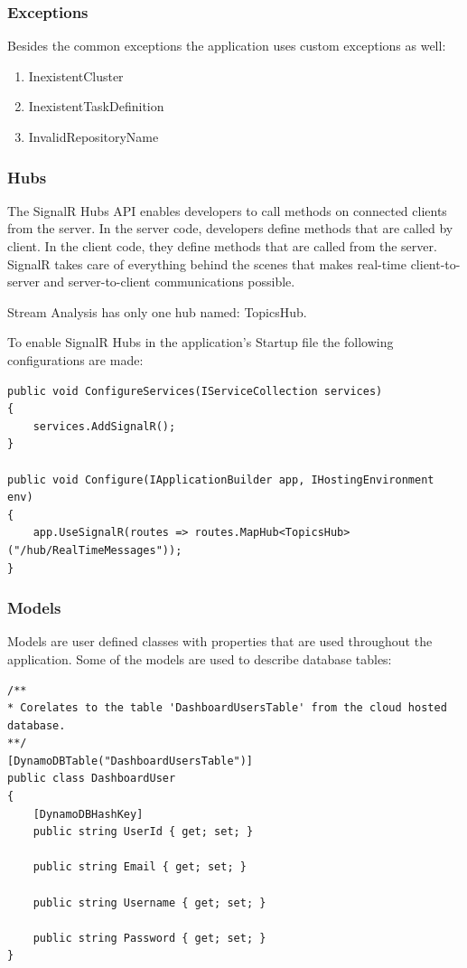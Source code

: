 \subsubsection{Exceptions}
\label{chap:04:02:03:02}
Besides the common exceptions the application uses custom exceptions as well:
\begin{enumerate}
	\item InexistentCluster
	\item InexistentTaskDefinition 
	\item InvalidRepositoryName
\end{enumerate}

\subsubsection{Hubs}
\label{chap:04:02:03:03}
The SignalR Hubs API enables developers to call methods on connected clients from the server. In the server code, developers define methods that are called by client. In the client code, they define methods that are called from the server. SignalR takes care of everything behind the scenes that makes real-time client-to-server and server-to-client communications possible.

Stream Analysis has only one hub named: TopicsHub.

To enable SignalR Hubs in the application's Startup file the following configurations are made:

\begin{lstlisting}
public void ConfigureServices(IServiceCollection services)
{
	services.AddSignalR();
}

public void Configure(IApplicationBuilder app, IHostingEnvironment env)
{
	app.UseSignalR(routes => routes.MapHub<TopicsHub>("/hub/RealTimeMessages"));
}
\end{lstlisting}

\subsubsection{Models}
\label{chap:04:02:03:04}
Models are user defined classes with properties that are used throughout the application. Some of the models are used to describe database tables:

\begin{lstlisting}
/**
* Corelates to the table 'DashboardUsersTable' from the cloud hosted database.
**/
[DynamoDBTable("DashboardUsersTable")]
public class DashboardUser
{
	[DynamoDBHashKey]
	public string UserId { get; set; }
	
	public string Email { get; set; }
	
	public string Username { get; set; }
	
	public string Password { get; set; }
}
\end{lstlisting}


